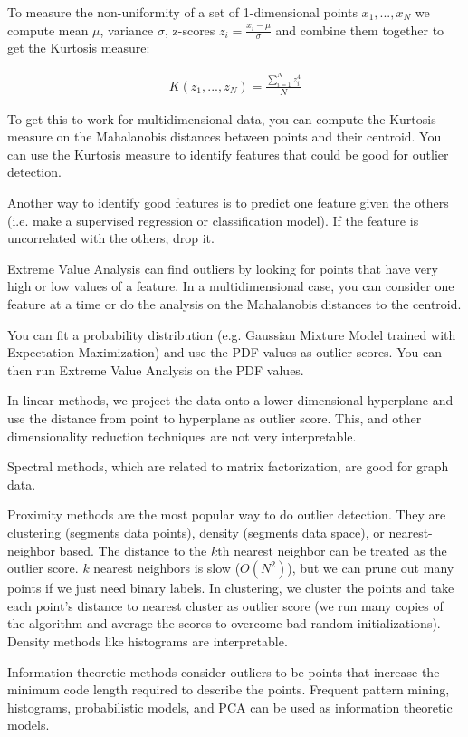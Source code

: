 \documentclass[a4paper]{article}
\begin{document}
To measure the non-uniformity of a set of 1-dimensional points $x_1, ..., x_N$
we compute mean $\mu$, variance $\sigma$, z-scores $z_i = \frac{x_i - \mu}{
\sigma}$ and combine them together to get the Kurtosis measure:

\begin{align}
  K(z_1, ..., z_N) = \frac{\sum_{i=1}^{N}{z_i^4}}{N}
\end{align}

To get this to work for multidimensional data, you can compute the Kurtosis
measure on the Mahalanobis distances between points and their centroid. You can
use the Kurtosis measure to identify features that could be good for outlier
detection.

Another way to identify good features is to predict one feature given the
others (i.e. make a supervised regression or classification model). If the
feature is uncorrelated with the others, drop it.

Extreme Value Analysis can find outliers by looking for points that have
very high or low values of a feature. In a multidimensional case, you can
consider one feature at a time or do the analysis on the Mahalanobis distances
to the centroid.

You can fit a probability distribution (e.g. Gaussian Mixture Model trained
with Expectation Maximization) and use the PDF values as outlier scores. You can
then run Extreme Value Analysis on the PDF values.

In linear methods, we project the data onto a lower dimensional hyperplane and
use the distance from point to hyperplane as outlier score. This, and other
dimensionality reduction techniques are not very interpretable.

Spectral methods, which are related to matrix factorization, are good for
graph data.

Proximity methods are the most popular way to do outlier detection. They are
clustering (segments data points), density (segments data space), or
nearest-neighbor based. The distance to the $k$th nearest neighbor can be
treated as the outlier score. $k$ nearest neighbors is slow ($O(N^2)$), but
we can prune out many points if we just need binary labels. In clustering,
we cluster the points and take each point's distance to nearest cluster as
outlier score (we run many copies of the algorithm and average the scores to
overcome bad random initializations). Density methods like histograms are
interpretable.

Information theoretic methods consider outliers to be points that increase the
minimum code length required to describe the points. Frequent pattern mining,
histograms, probabilistic models, and PCA can be used as information theoretic
models.
\end{document}
